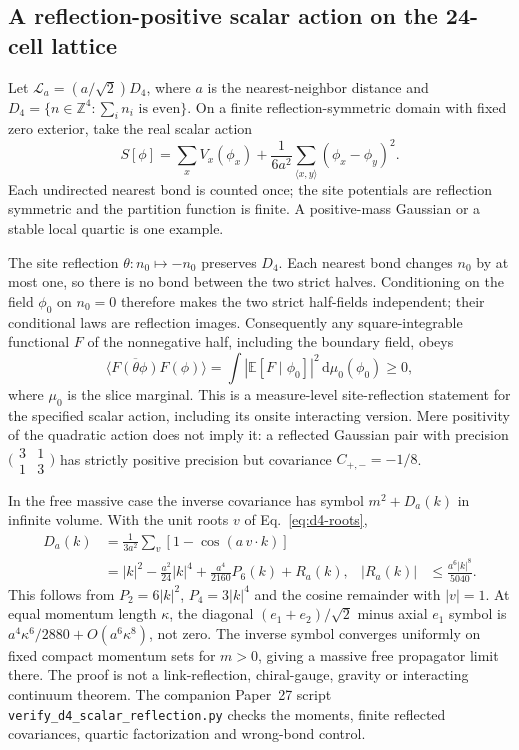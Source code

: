 \documentclass[11pt,a4paper]{article}
\begin{document}
\subsection{A reflection-positive scalar action on the 24-cell lattice}
\label{sec:scalar-site-reflection}
Let $\mathcal L_a=(a/\sqrt2)D_4$, where $a$ is the nearest-neighbor
distance and $D_4=\{n\in\mathbb Z^4:\sum_i n_i\text{ is even}\}$.
On a finite reflection-symmetric domain with fixed zero exterior,
take the real scalar action
\begin{equation}
 S[\phi]=\sum_x V_x(\phi_x)
    +\frac{1}{6a^2}\sum_{\langle x,y\rangle}(\phi_x-\phi_y)^2 .
 \label{eq:d4-scalar-action}
\end{equation}
Each undirected nearest bond is counted once; the site potentials
are reflection symmetric and the partition function is finite.
A positive-mass Gaussian or a stable local quartic is one example.

The site reflection $\theta:n_0\mapsto -n_0$ preserves $D_4$.
Each nearest bond changes $n_0$ by at most one, so there is no bond
between the two strict halves. Conditioning on the field $\phi_0$
on $n_0=0$ therefore makes the two strict half-fields independent;
their conditional laws are reflection images. Consequently any
square-integrable functional $F$ of the nonnegative half, including
the boundary field, obeys
\begin{equation}
 \big\langle\overline{F(\theta\phi)}F(\phi)\big\rangle
  =\int \left|\mathbb E[F\mid\phi_0]\right|^2\,
        \mathrm d\mu_0(\phi_0)\ge0 ,
 \label{eq:d4-scalar-os}
\end{equation}
where $\mu_0$ is the slice marginal. This is a measure-level
site-reflection statement for the specified scalar action, including
its onsite interacting version. Mere positivity of the quadratic
action does not imply it: a reflected Gaussian pair with precision
$\bigl(\begin{smallmatrix}3&1\\1&3\end{smallmatrix}\bigr)$
has strictly positive precision but covariance $C_{+,-}=-1/8$.

In the free massive case the inverse covariance has symbol $m^2+D_a(k)$
in infinite volume. With the unit roots $v$ of Eq.~\eqref{eq:d4-roots},
\begin{align}
 D_a(k)&=\frac{1}{3a^2}\sum_v[1-\cos(a\,v\cdot k)]\nonumber\\
 &=|k|^2-\frac{a^2}{24}|k|^4+\frac{a^4}{2160}P_6(k)+R_a(k),
 &|R_a(k)|&\le \frac{a^6|k|^8}{5040}.
 \label{eq:d4-scalar-symbol}
\end{align}
This follows from $P_2=6|k|^2$, $P_4=3|k|^4$ and the
cosine remainder with $|v|=1$. At equal momentum length $\kappa$,
the diagonal $(e_1+e_2)/\sqrt2$ minus axial $e_1$ symbol is
$a^4\kappa^6/2880+O(a^6\kappa^8)$, not zero. The inverse symbol
converges uniformly on fixed compact momentum sets for $m>0$,
giving a massive free propagator limit there. The proof is not a
link-reflection, chiral-gauge, gravity or interacting continuum
theorem. The companion Paper~27 script
\texttt{verify\_d4\_scalar\_reflection.py} checks the moments, finite
reflected covariances, quartic factorization and wrong-bond control.
\end{document}
